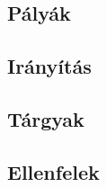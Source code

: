 \begin{enumerate}
\end{enumerate}

\subsection{Pályák}

\subsection{Irányítás}
\subsection{Tárgyak}
\subsection{Ellenfelek}